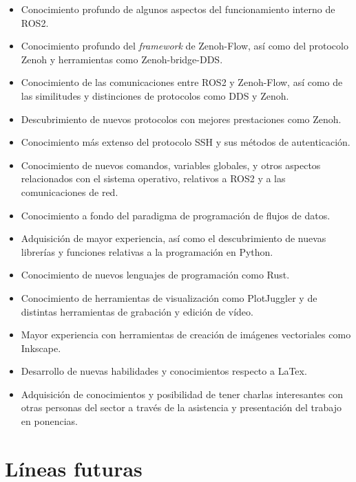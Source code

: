 \begin{itemize}
    \item{Conocimiento profundo de algunos aspectos del funcionamiento interno
        de ROS2.}
    \item{Conocimiento profundo del \textit{framework} de Zenoh-Flow, así como
        del protocolo Zenoh y herramientas como Zenoh-bridge-DDS.}
    \item{Conocimiento de las comunicaciones entre ROS2 y Zenoh-Flow, así como
        de las similitudes y distinciones de protocolos como DDS y Zenoh.}
    \item{Descubrimiento de nuevos protocolos con mejores prestaciones como
        Zenoh.}
    \item{Conocimiento más extenso del protocolo SSH y sus métodos de
        autenticación.}
    \item{Conocimiento de nuevos comandos, variables globales, y otros aspectos
        relacionados con el sistema operativo, relativos a ROS2 y a las
        comunicaciones de red.}
    \item{Conocimiento a fondo del paradigma de programación de flujos de
        datos.}
    \item{Adquisición de mayor experiencia, así como el descubrimiento de nuevas
        librerías y funciones relativas a la programación en Python.}
    \item{Conocimiento de nuevos lenguajes de programación como Rust.}
    \item{Conocimiento de herramientas de visualización como PlotJuggler y de
        distintas herramientas de grabación y edición de vídeo.}
    \item{Mayor experiencia con herramientas de creación de imágenes vectoriales
        como Inkscape.}
    \item{Desarrollo de nuevas habilidades y conocimientos respecto a LaTex.}
    \item{Adquisición de conocimientos y posibilidad de tener charlas
        interesantes con otras personas del sector a través de la asistencia y
        presentación del trabajo en ponencias.}
\end{itemize}


\section{Líneas futuras}
\label{sec:lineas_futuras}

